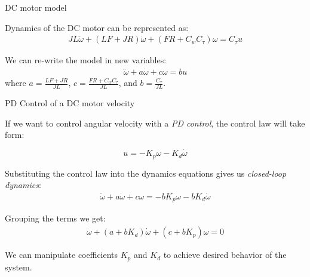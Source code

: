 \documentclass{beamer}
\begin{document}
\begin{frame}{DC motor model}
	\begin{flushleft}
		
		Dynamics of the DC motor can be represented as:
		\begin{align}
			JL \ddot \omega  + (LF+JR) \dot \omega   +( FR+C_w C_\tau)\omega =
			C_\tau u 
		\end{align}
		
		We can re-write the model in new variables:
		\begin{align}
			\ddot \omega  + a\dot \omega  + c\omega =
			b u 
		\end{align}
		where $a = \frac{LF+JR}{JL}$, $c = \frac{FR+C_w C_\tau}{JL}$, and $b = \frac{C_\tau}{JL}$.
		
	\end{flushleft}
\end{frame}


\begin{frame}{PD Control of a DC motor velocity}
	\begin{flushleft}
		
		If we want to control angular velocity with a \emph{PD control}, the control law will take form:
		
		\begin{equation}
			u = - K_p \omega - K_d \dot \omega
		\end{equation}
	
		Substituting the control law into the dynamics equations gives us \emph{closed-loop dynamics}:
		\begin{align}
			\ddot \omega  + a\dot \omega  + c\omega =
			- b K_p \omega - b K_d \dot \omega 
		\end{align}
		
		Grouping the terms we get:
		\begin{align}
			\ddot \omega  + (a + b K_d)\dot \omega  + (c + b K_p)\omega = 0
		\end{align}
		
		We can manipulate coefficients $K_p$ and $K_d$ to achieve desired behavior of the system.
		
	\end{flushleft}
\end{frame}
\end{document}
